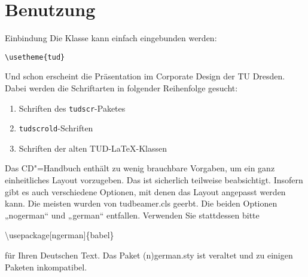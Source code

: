\section{Benutzung}

\begin{frame}[allowframebreaks]{Einbindung}
  Die Klasse kann einfach eingebunden werden:
  \begin{block}{}
    \texttt{\textbackslash usetheme\{tud\}}
  \end{block}
  Und schon erscheint die Präsentation im Corporate Design der TU Dresden. 
  Dabei werden die Schriftarten in folgender Reihenfolge gesucht:
  \begin{enumerate}
  \item Schriften des \texttt{tudscr}-Paketes
  \item \texttt{tudscrold}-Schriften
  \item Schriften der alten TUD-\LaTeX-Klassen
  \end{enumerate}

  Das CD"=Handbuch enthält zu wenig brauchbare Vorgaben, um ein ganz einheitliches Layout vorzugeben. Das ist sicherlich teilweise beabsichtigt. Insofern gibt es auch verschiedene Optionen, mit denen das Layout angepasst werden kann. Die meisten wurden von tudbeamer.cls geerbt. Die beiden Optionen „nogerman“ und „german“ entfallen. Verwenden Sie stattdessen bitte
  \begin{block}{}
    \textbackslash usepackage[ngerman]\{babel\}
  \end{block}
  für Ihren Deutschen Text. Das Paket (n)german.sty ist veraltet und zu einigen Paketen inkompatibel.
\end{frame}

